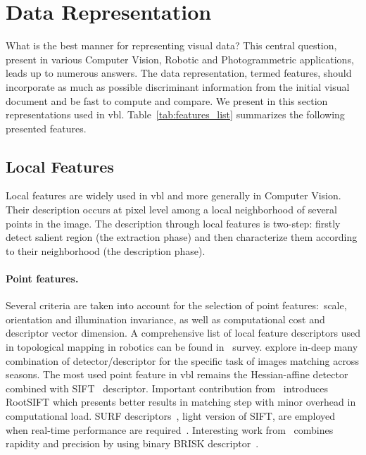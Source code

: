\section{Data Representation}
\label{sec:image_representation}
	What is the best manner for representing visual data? This central question, present in various Computer Vision, Robotic and Photogrammetric applications, leads up to numerous answers. The data representation, termed features, should incorporate as much as possible discriminant information from the initial visual document and be fast to compute and compare. We present in this section representations used in \ac{vbl}. Table~\ref{tab:features_list} summarizes the following presented features.
		
	\subsection{Local Features}
	\label{subsec:local_feature}
		Local features are widely used in \ac{vbl} and more generally in Computer Vision. Their description occurs at pixel level among a local neighborhood of several points in the image. The description through local features is two-step: firstly detect salient region (the extraction phase) and then characterize them according to their neighborhood (the description phase).
				
		\paragraph{Point features.} 
			Several criteria are taken into account for the selection of point features:~scale, orientation and illumination invariance, as well as computational cost and descriptor vector dimension. A comprehensive list of local feature descriptors used in topological mapping in robotics can be found in~\citet{Garcia-Fidalgo2015} survey. \citet{Krajnik2017a} explore in-deep many combination of detector/descriptor for the specific task of images matching across seasons. The most used point feature in \ac{vbl} remains the Hessian-affine detector~\citep{Mikolajczyk2004} combined with SIFT~\citep{Lowe2004} descriptor. Important contribution from~\citet{Arandjelovic2012} introduces RootSIFT which presents better results in matching step with minor overhead in computational load. SURF descriptors~\citep{Bay2006}, light version of SIFT, are employed when real-time performance are required~\citep{Cummins2008,Qu2016,Stumm2016}. Interesting work from~\citet{Feng2016a} combines rapidity and precision by using binary BRISK descriptor~\citep{Leutenegger2011brisk}.
        
